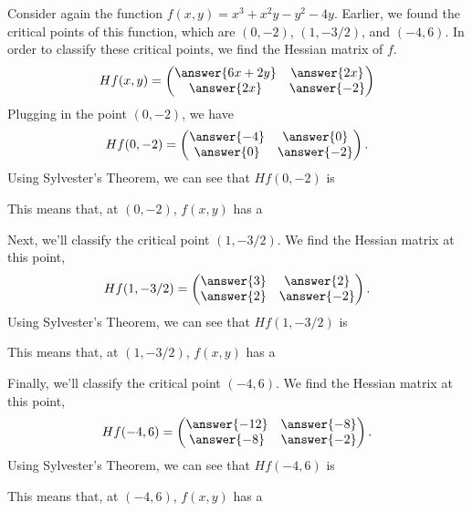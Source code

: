 \documentclass{ximera}
\begin{document}
\begin{example}
Consider again the function $f(x,y) = x^3+x^2y-y^2-4y$. Earlier, we found the critical points of this function, which are $(0,-2)$, $(1,-3/2)$, and $(-4,6)$. In order to classify these critical points, we find the Hessian matrix of $f$.
\[
Hf(x,y) = \begin{pmatrix}
\answer{6x+2y} & \answer{2x}\\
\answer{2x} & \answer{-2}
\end{pmatrix}
\]
Plugging in the point $(0,-2)$, we have
\[
Hf(0,-2) = \begin{pmatrix}
\answer{-4} & \answer{0}\\
\answer{0} & \answer{-2}
\end{pmatrix}.
\]
Using Sylvester's Theorem, we can see that $Hf(0,-2)$ is
\begin{multipleChoice}
\end{multipleChoice}
This means that, at $(0,-2)$, $f(x,y)$ has a
\begin{multipleChoice}
\end{multipleChoice}
Next, we'll classify the critical point $(1,-3/2)$. We find the Hessian matrix at this point,
\[
Hf(1,-3/2) = \begin{pmatrix}
\answer{3} & \answer{2}\\
\answer{2} & \answer{-2}
\end{pmatrix}.
\]
Using Sylvester's Theorem, we can see that $Hf(1,-3/2)$ is
\begin{multipleChoice}
\end{multipleChoice}
This means that, at $(1,-3/2)$, $f(x,y)$ has a
\begin{multipleChoice}
\end{multipleChoice}
Finally, we'll classify the critical point $(-4,6)$. We find the Hessian matrix at this point,
\[
Hf(-4,6) = \begin{pmatrix}
\answer{-12} & \answer{-8}\\
\answer{-8} & \answer{-2}
\end{pmatrix}.
\]
Using Sylvester's Theorem, we can see that $Hf(-4,6)$ is
\begin{multipleChoice}
\end{multipleChoice}
This means that, at $(-4,6)$, $f(x,y)$ has a
\begin{multipleChoice}
\end{multipleChoice}
\end{example}
\end{document}
